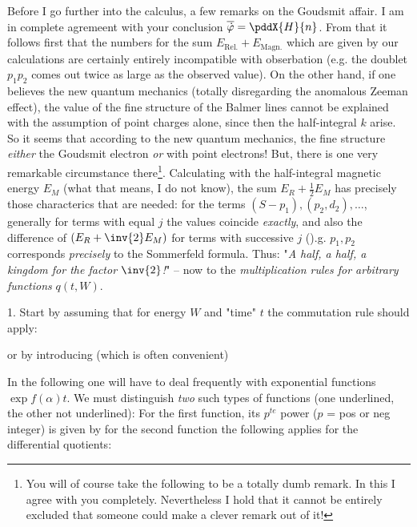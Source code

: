 Before I go further into the calculus, a few remarks on the Goudsmit affair. I am in complete agremeent with your conclusion $\overline{\dot{\varphi}} = \pddX{H}{n}$. From that it follows first that the numbers for the sum $E_\text{Rel.} + E_\text{Magn.}$ which are given by our calculations are certainly entirely incompatible with obserbation (e.g. the doublet $p_1 p_2$ comes out twice as large as the observed value). On the other hand, if one believes the new quantum mechanics (totally disregarding the anomalous Zeeman effect), the value of the fine structure of the Balmer lines cannot be explained with the assumption of point charges alone, since then the half-integral $k$ arise. So it seems that according to the new quantum mechanics, the fine structure  \textit{either} the Goudsmit electron \textit{or} with point electrons! But, there is one very remarkable circumstance there\footnote{You will of course take the following to be a totally dumb remark. In this I agree with you completely. Nevertheless I hold that it cannot be entirely excluded that someone could make a clever remark out of it!}. Calculating with the half-integral magnetic energy $E_M$ (what that means, I do not know), the sum $E_R + \frac{1}{2}E_M$ has precisely those characterics that are needed: for the terms $(S-p_1), (p_2, d_2), \dots$, generally for terms with equal $j$ the values coincide \textit{exactly}, and also the difference of $(E_R + \inv{2}E_M)$ for terms with successive $j$ ().g. $p_1, p_2$
 corresponds \textit{precisely} to the Sommerfeld formula. Thus: "\textit{A half, a half, a kingdom for the factor $\inv{2}$!}" -- now to the \textit{multiplication rules for arbitrary functions} $q(t, W)$.
 
1. Start by assuming that for energy $W$ and "time" $t$ the commutation rule should apply:

or by introducing
(which is often convenient)

In the following one will have to deal frequently with exponential functions $\exp{f(\alpha)t}$. We must distinguish \textit{two} such types of functions (one underlined, the other not underlined):
 For the first function, its $p^{te}$ power ($p$ = pos or neg integer) is given by
for the second function the following applies for the differential quotients:

